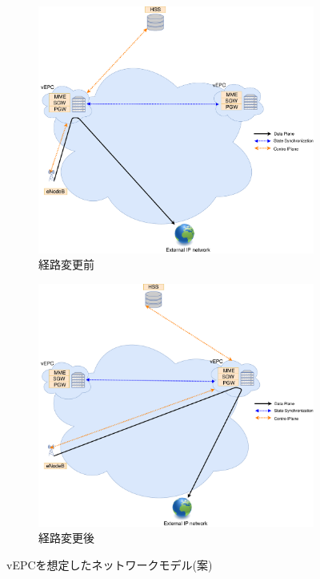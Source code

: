 \documentclass[a4j]{ujarticle}
\begin{document}
\begin{figure}[p]
	\centering
		\begin{subfigure}{1.0\textwidth}
		\centering
			\includegraphics[width=0.5\hsize]{vEPC_before.pdf}
			\caption{経路変更前}
			\label{vEPC_before}
		\end{subfigure}
		\begin{subfigure}{1.0\textwidth}
		\centering
			\includegraphics[width=0.5\hsize]{vEPC_after.pdf}
			\caption{経路変更後}
			\label{vEPC_after}
		\end{subfigure}
		\caption{vEPCを想定したネットワークモデル(案)}
		\label{vEPC}
\end{figure}
\end{document}
